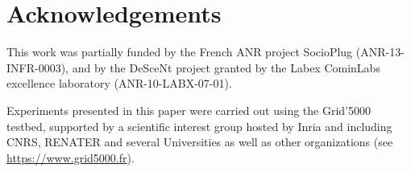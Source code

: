 \section*{Acknowledgements}

This work was partially funded by the French ANR project SocioPlug
(ANR-13-INFR-0003), and by the DeSceNt project granted by the Labex CominLabs
excellence laboratory (ANR-10-LABX-07-01).  

Experiments presented in this paper were carried out using the Grid'5000
testbed, supported by a scientific interest group hosted by Inria and including
CNRS, RENATER and several Universities as well as other organizations (see
\url{https://www.grid5000.fr}).
